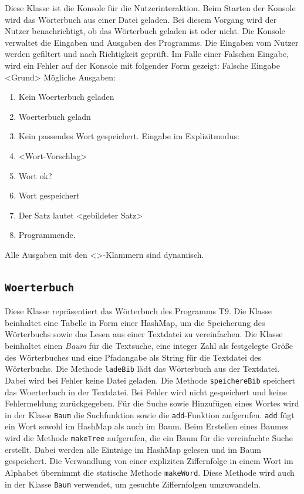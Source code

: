     Diese Klasse ist die Konsole für die Nutzerinteraktion. Beim Starten der Konsole wird das Wörterbuch aus einer Datei geladen. Bei diesem Vorgang wird der Nutzer benachrichtigt, ob das Wörterbuch geladen ist oder nicht.
    Die Konsole verwaltet die Eingaben und Ausgaben des Programms. Die Eingaben vom Nutzer werden gefiltert und nach Richtigkeit geprüft. Im Falle einer Falschen Eingabe, wird ein Fehler auf der Konsole mit folgender Form gezeigt:\newline
    Falsche Eingabe\newline
    \textless Grund\textgreater
    \newline
    Mögliche Ausgaben:
    \begin{enumerate}
        \item Kein Woerterbuch geladen
        \item Woerterbuch geladn
        \item Kein passendes Wort gespeichert. Eingabe im Explizitmodus:
        \item \textless Wort-Vorschlag\textgreater
        \item Wort ok?
        \item Wort gespeichert
        \item Der Satz lautet \textless gebildeter Satz\textgreater
        \item Programmende.
    \end{enumerate}{}
    Alle Ausgaben mit den \textless \textgreater -Klammern sind dynamisch.
    
    
    
\subsection{\texttt{Woerterbuch}}
    
    Diese Klasse repräsentiert das Wörterbuch des Programms T9. Die Klasse beinhaltet eine Tabelle in Form einer HashMap, um die Speicherung des Wörterbuchs sowie das Lesen aus einer Textdatei zu vereinfachen.
    Die Klasse beinhaltet einen \textit{Baum} für die Textsuche, eine integer Zahl als festgelegte Größe des Wörterbuches und eine Pfadangabe als String für die Textdatei des Wörterbuchs.
    Die Methode \texttt{ladeBib} lädt das Wörterbuch aus der Textdatei. Dabei wird bei Fehler keine Datei geladen.
    Die Methode \texttt{speichereBib} speichert das Woerterbuch in der Textdatei. Bei Fehler wird nicht gespeichert und keine Fehlermeldung zurückgegeben.
    Für die Suche sowie Hinzufügen eines Wortes wird in der Klasse \texttt{Baum} die Suchfunktion sowie die \texttt{add}-Funktion aufgerufen. \texttt{add} fügt ein Wort sowohl im HashMap als auch im Baum.
    Beim Erstellen eines Baumes wird die Methode \texttt{makeTree} aufgerufen, die ein Baum für die vereinfachte Suche erstellt. Dabei werden alle Einträge im HashMap gelesen und im Baum gespeichert.
    Die Verwandlung von einer expliziten Ziffernfolge in einem Wort im Alphabet übernimmt die statische Methode \texttt{makeWord}. Diese Methode wird auch in der Klasse \texttt{Baum} verwendet, um gesuchte Ziffernfolgen umzuwandeln.
    
